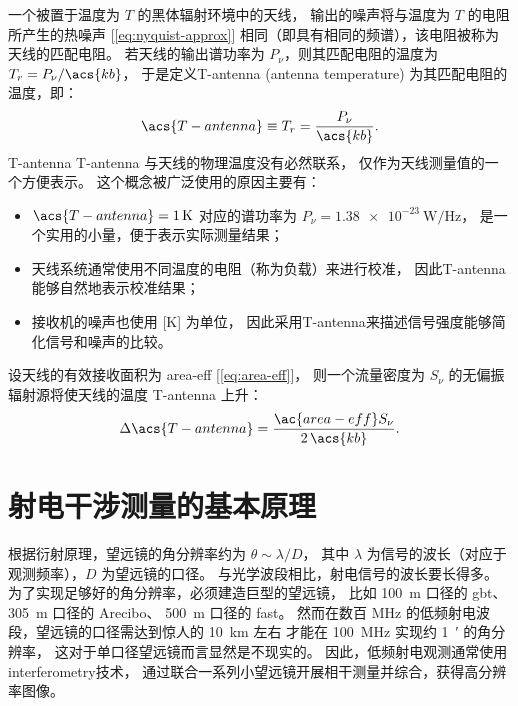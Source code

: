一个被置于温度为 $T$ 的黑体辐射环境中的天线，
输出的噪声将与温度为 $T$ 的电阻所产生的热噪声 [\autoref{eq:nyquist-approx}]
相同（即具有相同的频谱），该电阻被称为天线的匹配电阻。
若天线的输出谱功率为 $P_{\nu}$，则其匹配电阻的温度为
$T_r = P_{\nu} / \acs{kb}$，
于是定义\acl{T-antenna} (antenna temperature) 为其匹配电阻的温度，即：
\begin{equation}
  \label{eq:t-ant}
  \acs{T-antenna} \equiv T_r = \frac{P_{\nu}}{\acs{kb}} .
\end{equation}
\acl{T-antenna} \ac{T-antenna} 与天线的物理温度没有必然联系，
仅作为天线测量值的一个方便表示。
这个概念被广泛使用的原因主要有：
\begin{itemize}
  \item $\acs{T-antenna} = \SI{1}{\kelvin}$ 对应的谱功率为
    $P_{\nu} = \SI{1.38e-23}{\watt\per\hertz}$，
    是一个实用的小量，便于表示实际测量结果；
  \item 天线系统通常使用不同温度的电阻（称为负载）来进行校准，
    因此\acl{T-antenna}能够自然地表示校准结果；
  \item 接收机的噪声也使用 [\si{\kelvin}] 为单位，
    因此采用\acl{T-antenna}来描述信号强度能够简化信号和噪声的比较。
\end{itemize}

设天线的有效接收面积为 \ac{area-eff} [\autoref{eq:area-eff}]，
则一个流量密度为 $S_{\nu}$ 的无偏振辐射源将使天线的温度 \acs{T-antenna} 上升：
\begin{equation}
  \label{eq:dt-source}
  \Delta\acs{T-antenna} = \frac{\ac{area-eff} S_{\nu}}{2\,\acs{kb}} .
\end{equation}


\section{射电干涉测量的基本原理}
\label{sec:interferometry}

根据衍射原理，望远镜的角分辨率约为 $\theta \sim \lambda / D$，
其中 $\lambda$ 为信号的波长（对应于观测频率），$D$ 为望远镜的口径。
与光学波段相比，射电信号的波长要长得多。
为了实现足够好的角分辨率，必须建造巨型的望远镜，
比如 \SI{100}{\meter} 口径的 \ac{gbt}、
\SI{305}{\meter} 口径的 Arecibo、
\SI{500}{\meter} 口径的 \ac{fast}。
然而在数百 \si{\MHz} 的低频射电波段，望远镜的口径需达到惊人的 \SI{10}{\km} 左右
才能在 \SI{100}{\MHz} 实现约 \SI{1}{\arcminute} 的角分辨率，
这对于单口径望远镜而言显然是不现实的。
因此，低频射电观测通常使用\ac{interferometry}技术，
通过联合一系列小望远镜开展相干测量并综合，获得高分辨率图像。

